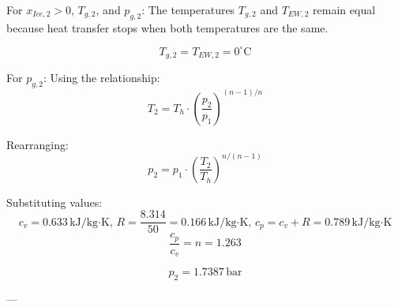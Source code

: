 For \( x_{Ice,2} > 0 \), \( T_{g,2} \), and \( p_{g,2} \):  
The temperatures \( T_{g,2} \) and \( T_{EW,2} \) remain equal because heat transfer stops when both temperatures are the same.  

\[ T_{g,2} = T_{EW,2} = 0^\circ \text{C} \]  

For \( p_{g,2} \):  
Using the relationship:  
\[ T_2 = T_h \cdot \left( \frac{p_2}{p_1} \right)^{(n-1)/n} \]  

Rearranging:  
\[ p_2 = p_1 \cdot \left( \frac{T_2}{T_h} \right)^{n/(n-1)} \]  

Substituting values:  
\[ c_v = 0.633 \, \text{kJ/kg·K}, \, R = \frac{8.314}{50} = 0.166 \, \text{kJ/kg·K}, \, c_p = c_v + R = 0.789 \, \text{kJ/kg·K} \]  
\[ \frac{c_p}{c_v} = n = 1.263 \]  

\[ p_2 = 1.7387 \, \text{bar} \]  

---